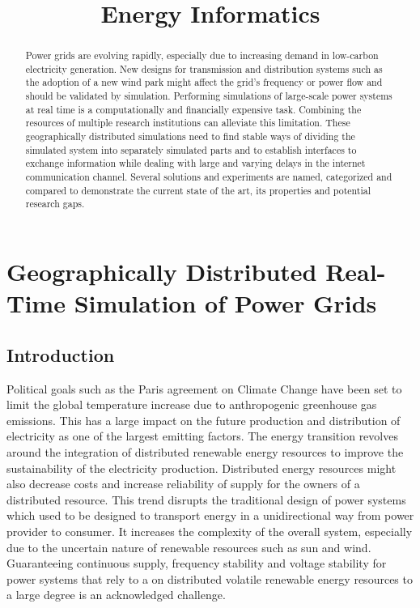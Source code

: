 \documentclass[a4paper]{atseminar}
\title{Energy Informatics}
\author{}
\begin{document}
\maketitle

\ENGLISH

\section{Geographically Distributed Real-Time Simulation of Power Grids}

\begin{abstract}
Power grids are evolving rapidly, especially due to increasing demand in low-carbon electricity generation. New designs for transmission and distribution systems such as the adoption of a new wind park might affect the grid's frequency or power flow and should be validated by simulation. Performing simulations of large-scale power systems at real time is a computationally and financially expensive task. Combining the resources of multiple research institutions can alleviate this limitation. 
These geographically distributed simulations need to find stable ways of dividing the simulated system into separately simulated parts and to establish interfaces to exchange information while dealing with large and varying delays in the internet communication channel. Several solutions and experiments are named, categorized and compared to demonstrate the current state of the art, its properties and potential research gaps.

\end{abstract}

\subsection{Introduction}

Political goals such as the Paris agreement on Climate Change have been set to limit the global temperature increase due to anthropogenic greenhouse gas emissions. This has a large impact on the future production and distribution of electricity as one of the largest emitting factors. The energy transition revolves around the integration of distributed renewable energy resources to improve the sustainability of the electricity production. Distributed energy resources might also decrease costs and increase reliability of supply for the owners of a distributed resource.
This trend disrupts the traditional design of power systems which used to be designed to transport energy in a unidirectional way from power provider to consumer. It increases the complexity of the overall system, especially due to the uncertain nature of renewable resources such as sun and wind. Guaranteeing continuous supply, frequency stability and voltage stability for power systems that rely to a on distributed volatile renewable energy resources to a large degree is an acknowledged challenge.
\end{document}
